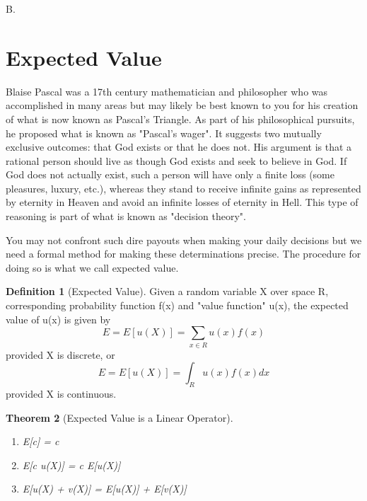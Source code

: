 \documentclass[10pt,]{book}
\theoremstyle{plain}
\newtheorem{theorem}{Theorem}[section]
\theoremstyle{definition}
\newtheorem{definition}[theorem]{Definition}
\theoremstyle{definition}
\theoremstyle{definition}
\numberwithin{equation}{section}
\begin{document}
	B.  
\typeout{************************************************}
\typeout{************************************************}
\section[{Expected Value}]{Expected Value}\label{section-24}
Blaise Pascal was a 	17th century mathematician and philosopher who was accomplished in many areas but may likely be best known to you for his creation of what is now known as Pascal's Triangle. As part of his philosophical pursuits, he proposed what is known as "Pascal's wager". It suggests two  mutually exclusive outcomes: that God exists or that he does not. His argument is that a rational person should live as though God exists and seek to believe in God. If God does not actually exist, such a person will have only a finite loss (some pleasures, luxury, etc.), whereas they stand to receive infinite gains as represented by eternity in Heaven and avoid an infinite losses of eternity in Hell. This type of reasoning is part of what is known as "decision theory".
\par
You may not confront such dire payouts when making your daily decisions but we need a formal method for making these determinations precise. The procedure for doing so is what we call expected value.
\begin{definition}[{Expected Value}]\label{definition-30}
Given a random variable X over space R, corresponding probability function f(x) and "value function" u(x), the expected value of u(x) is given by
	\begin{equation*}E = E[u(X)] = \sum_{x \in R} u(x) f(x)\end{equation*}
	provided X is discrete, or
	\begin{equation*}E = E[u(X)] = \int_R u(x)f(x) dx\end{equation*}
	provided X is continuous.
\end{definition}
\begin{theorem}[{Expected Value is a Linear Operator}]\label{theorem-31}

	\leavevmode%
\begin{enumerate}
\item\hypertarget{li-155}{}E[c] = c%
\item\hypertarget{li-156}{}E[c u(X)] = c E[u(X)]%
\item\hypertarget{li-157}{}E[u(X) + v(X)] = E[u(X)] + E[v(X)]%
\end{enumerate}

\end{theorem}
\end{document}
